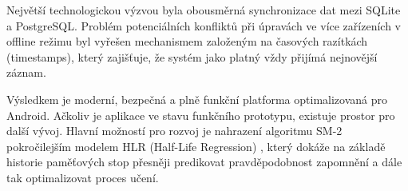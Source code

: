 \documentclass[12pt, a4paper, oneside]{article}
\begin{document}
	Největší technologickou výzvou byla obousměrná synchronizace dat mezi SQLite a PostgreSQL. Problém potenciálních konfliktů při úpravách ve více zařízeních v offline režimu byl vyřešen mechanismem založeným na časových razítkách (timestamps), který zajišťuje, že systém jako platný vždy přijímá nejnovější záznam.
	
	Výsledkem je moderní, bezpečná a plně funkční platforma optimalizovaná pro Android. Ačkoliv je aplikace ve stavu funkčního prototypu, existuje prostor pro další vývoj. Hlavní možností pro rozvoj je nahrazení algoritmu SM-2 pokročilejším modelem HLR (Half-Life Regression) \cite{hlr}, který dokáže na základě historie paměťových stop přesněji predikovat pravděpodobnost zapomnění a dále tak optimalizovat proces učení.
	
	\newpage
	
\end{document}
